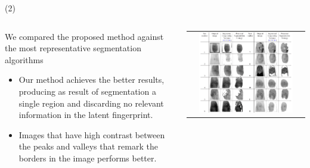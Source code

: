 \begin{frame}{ (2)}



\begin{columns}
		\begin{column}{0.48\textwidth}
		We compared the proposed method against the most representative segmentation algorithms
		\begin{itemize}
		\item Our method achieves the better results, producing as result of
segmentation a single region and discarding no relevant information in the latent fingerprint.
    \item Images that have high contrast between the peaks and valleys that remark the borders in the image performs better.
				\end{itemize}
        \end{column}
				\begin{column}{0.48\textwidth}
				
\begin{center}
     \begin{tabular}{c}
              \includegraphics[width=0.85\textwidth]{Figs/Fingerprint3}
          \end{tabular}
\end{center}
				\end{column}
								\end{columns}

\end{frame}







